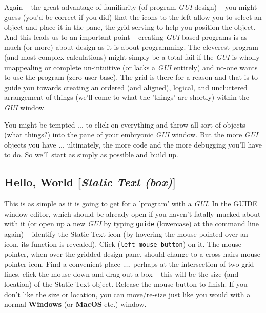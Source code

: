 \documentclass{tufte-book} %
\begin{document}
Again -- the great advantage of familiarity (of program \textit{GUI} design) -- you might guess (you'd be correct if you did) that the icons to the left allow you to select an object and place it in the pane, the grid serving to help you position the object. And this leads us to an important point -- creating \textit{GUI}-based programs is as much (or more) about design as it is about programming. The cleverest program (and most complex calculations) might simply be a total fail if the \textit{GUI} is wholly unappealing or complete un-intuitive (or lacks a \textit{GUI} entirely) and no-one wants to use the program (zero user-base). The grid is  there for a reason and that is to guide you towards creating an ordered (and aligned), logical, and uncluttered arrangement of things (we'll come to what the 'things' are shortly) within the \textit{GUI} window.

You might be tempted ... to click on everything and throw all sort of objects (what things?) into the pane of your embryonic \textit{GUI} window. But the more \textit{GUI} objects you have ... ultimately, the more code and the more debugging you'll have to do. So we'll start as simply as possible and build up. 


\subsection{Hello, World [\textit{Static Text (box)}]}

This is as simple as it is going to get for a 'program' with a \textit{GUI}. In the \textsf{GUIDE window editor}, which should be already open if you haven't fatally mucked about with it (or open up a new \textit{GUI} by typing \texttt{guide} (\uline{lowercase}) at the command line again) -- identify the \textsf{Static Text} icon (by hovering the mouse pointed over an icon, its function is revealed). Click (\texttt{left mouse button}) on it. The mouse pointer, when over the gridded design pane, should change to a cross-hairs mouse pointer icon. Find a convenient place .... perhaps at the intersection of two grid lines, click the mouse down and drag out a box -- this will be the size (and location) of the \textsf{Static Text} object. Release the mouse button to finish. If you don't like the size or location, you can move/re-size just like you would with a normal \textbf{Windows} (or \textbf{MacOS} etc.) window.
\end{document}
